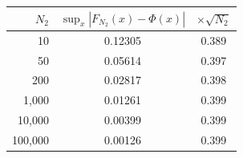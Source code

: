 \begin{tabular}{rcc}
\toprule
$N_2$ & $\sup_x|F_{N_2}(x)-\Phi(x)|$ & $\times\sqrt{N_2}$ \\
\midrule
10 & 0.12305 & 0.389 \\
50 & 0.05614 & 0.397 \\
200 & 0.02817 & 0.398 \\
1,000 & 0.01261 & 0.399 \\
10,000 & 0.00399 & 0.399 \\
100,000 & 0.00126 & 0.399 \\
\bottomrule
\end{tabular}
